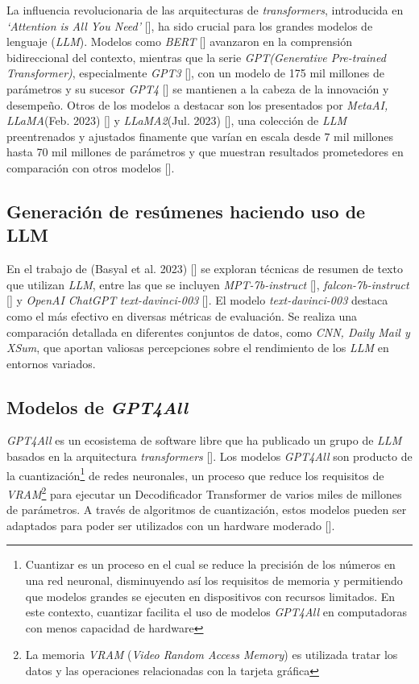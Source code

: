     La influencia revolucionaria de las arquitecturas de \emph{transformers}, introducida en \emph{`Attention is All You Need'}  [\cite{attention}], ha sido crucial para los grandes modelos de lenguaje (\emph{LLM}). Modelos como \emph{BERT} [\cite{BERT}] avanzaron en la comprensión bidireccional del contexto, mientras que la serie \emph{GPT}\emph{(Generative Pre-trained Transformer)}, especialmente \emph{GPT3} [\cite{brown2020language}], con un modelo de 175 mil millones de parámetros y su sucesor \emph{GPT4} [\cite{openai2023gpt4}] se mantienen a la cabeza de la innovación y desempeño. Otros de los modelos a destacar son los presentados por \emph{MetaAI, LLaMA}(Feb. 2023) [\cite{llamapaper}] y \emph{LLaMA2}(Jul. 2023) [\cite{llamapaper2}], una colección de \emph{LLM} preentrenados y ajustados finamente que varían en escala desde 7 mil millones hasta 70 mil millones de parámetros y que muestran resultados prometedores en comparación con otros modelos [\cite{metallama}]. 
    
    \subsection{Generación de resúmenes haciendo uso de LLM}

    En el trabajo de (Basyal et al. 2023) [\cite{basyal2023text}] se exploran técnicas de resumen de texto que utilizan \emph{LLM}, entre las que se incluyen \emph{MPT-7b-instruct} [\cite{mpt}], \emph{falcon-7b-instruct} [\cite{falcon}] y \emph{OpenAI ChatGPT} \emph{text-davinci-003} [\cite{brown2020language}]. El modelo \emph{text-davinci-003} destaca como el más efectivo en diversas métricas de evaluación. Se realiza una comparación detallada en diferentes conjuntos de datos, como \emph{CNN, Daily Mail y XSum}, que aportan valiosas percepciones sobre el rendimiento de los \emph{LLM} en entornos variados. 

    \subsection{Modelos de \emph{GPT4All}}

        \emph{GPT4All} es un ecosistema de software libre que ha publicado un grupo de \emph{LLM} basados en la arquitectura \emph{transformers} [\cite{attention}]. Los modelos \emph{GPT4All} son producto de la cuantización\footnote{Cuantizar es un proceso en el cual se reduce la precisión de los números en una red neuronal, disminuyendo así los requisitos de memoria y permitiendo que modelos grandes se ejecuten en dispositivos con recursos limitados. En este contexto, cuantizar facilita el uso de modelos \emph{GPT4All} en computadoras con menos capacidad de hardware} de redes neuronales, un proceso que reduce los requisitos de \emph{VRAM}\footnote{La memoria \emph{VRAM} (\emph{Video Random Access Memory}) es utilizada tratar los datos y las operaciones relacionadas con la tarjeta gráfica} para ejecutar un Decodificador Transformer de varios miles de millones de parámetros. A través de algoritmos de cuantización, estos modelos pueden ser adaptados para poder ser utilizados con un hardware moderado [\cite{webgpt4all}].
        
